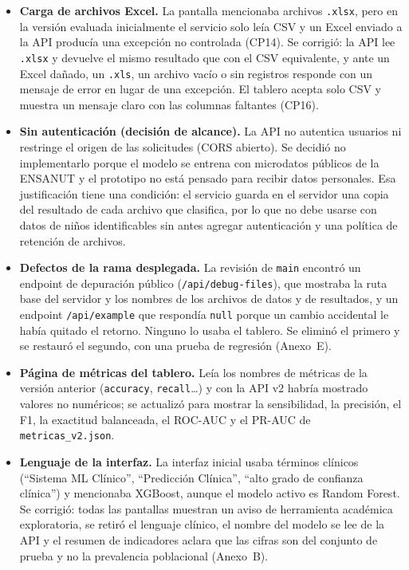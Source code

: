\begin{itemize}
  \item \textbf{Carga de archivos Excel.} La pantalla mencionaba archivos \texttt{.xlsx}, pero en la versión evaluada inicialmente el servicio solo leía CSV y un Excel enviado a la API producía una excepción no controlada (CP14). Se corrigió: la API lee \texttt{.xlsx} y devuelve el mismo resultado que con el CSV equivalente, y ante un Excel dañado, un \texttt{.xls}, un archivo vacío o sin registros responde con un mensaje de error en lugar de una excepción. El tablero acepta solo CSV y muestra un mensaje claro con las columnas faltantes (CP16).
  \item \textbf{Sin autenticación (decisión de alcance).} La API no autentica usuarios ni restringe el origen de las solicitudes (CORS abierto). Se decidió no implementarlo porque el modelo se entrena con microdatos públicos de la ENSANUT y el prototipo no está pensado para recibir datos personales. Esa justificación tiene una condición: el servicio guarda en el servidor una copia del resultado de cada archivo que clasifica, por lo que no debe usarse con datos de niños identificables sin antes agregar autenticación y una política de retención de archivos.
  \item \textbf{Defectos de la rama desplegada.} La revisión de \texttt{main} encontró un endpoint de depuración público (\texttt{/api/debug-files}), que mostraba la ruta base del servidor y los nombres de los archivos de datos y de resultados, y un endpoint \texttt{/api/example} que respondía \texttt{null} porque un cambio accidental le había quitado el retorno. Ninguno lo usaba el tablero. Se eliminó el primero y se restauró el segundo, con una prueba de regresión (Anexo~E).
  \item \textbf{Página de métricas del tablero.} Leía los nombres de métricas de la versión anterior (\texttt{accuracy}, \texttt{recall}\ldots) y con la API v2 habría mostrado valores no numéricos; se actualizó para mostrar la sensibilidad, la precisión, el F1, la exactitud balanceada, el ROC-AUC y el PR-AUC de \texttt{metricas\_v2.json}.
  \item \textbf{Lenguaje de la interfaz.} La interfaz inicial usaba términos clínicos (``Sistema ML Clínico'', ``Predicción Clínica'', ``alto grado de confianza clínica'') y mencionaba XGBoost, aunque el modelo activo es Random Forest. Se corrigió: todas las pantallas muestran un aviso de herramienta académica exploratoria, se retiró el lenguaje clínico, el nombre del modelo se lee de la API y el resumen de indicadores aclara que las cifras son del conjunto de prueba y no la prevalencia poblacional (Anexo~B).
\end{itemize}


